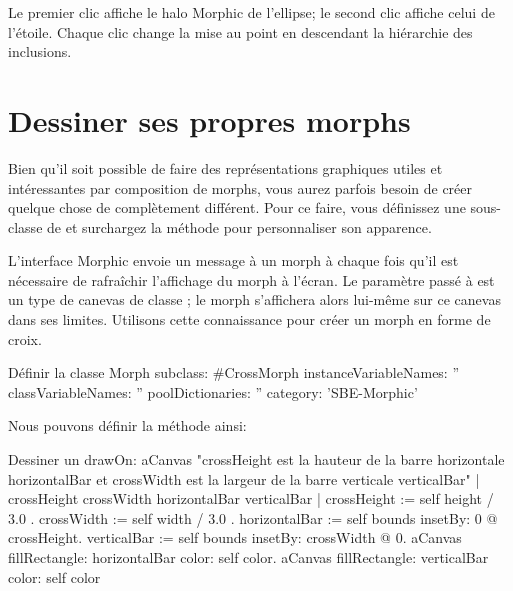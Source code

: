 \documentclass[a4paper,10pt,twoside]{book}
\begin{document}

\noindent
Le premier clic affiche le halo Morphic de l'ellipse; le second clic
affiche celui de l'étoile. Chaque clic change la mise au point en
descendant la hiérarchie des inclusions.


\section{Dessiner ses propres morphs}

Bien qu'il soit possible de faire des représentations graphiques
utiles et intéressantes par composition de morphs, vous aurez
parfois besoin de créer quelque chose de complètement différent.
Pour ce faire, vous définissez une sous-classe de  et
surchargez la méthode  pour personnaliser son
apparence.

L'interface Morphic envoie un message  \`a un morph \`a
chaque fois qu'il est nécessaire de rafraîchir l'affichage du
morph \`a l'écran. Le paramètre passé \`a  est un
type de canevas de classe ; le morph s'affichera alors
lui-même sur ce canevas dans ses limites. %
Utilisons cette connaissance pour créer un morph en forme de croix.

\begin{classdef}{Définir la classe }
Morph subclass: #CrossMorph
	instanceVariableNames: ''
	classVariableNames: ''
	poolDictionaries: ''
	category: 'SBE-Morphic'
\end{classdef}

Nous pouvons définir la méthode  ainsi:
\begin{method}[firstDrawOn]{Dessiner un }
drawOn: aCanvas 
	"crossHeight est la hauteur de la barre horizontale horizontalBar
    et crossWidth est la largeur de la barre verticale verticalBar"
    | crossHeight crossWidth horizontalBar verticalBar |
	crossHeight := self height / 3.0 .
	crossWidth := self width / 3.0 .
	horizontalBar := self bounds insetBy: 0 @ crossHeight.
	verticalBar := self bounds insetBy: crossWidth @ 0.
	aCanvas fillRectangle: horizontalBar color: self color.
	aCanvas fillRectangle: verticalBar color: self color
\end{method}
\end{document}
